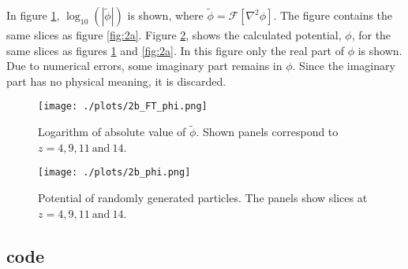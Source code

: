 In figure \ref{fig:2b_1}, $\log_{10} \left(| \widetilde{\phi} | \right)$ is shown, where $\widetilde{\phi} = \mathcal{F}\left[\nabla^2 \phi\right]$. The figure contains the same slices as figure \ref{fig:2a}. Figure \ref{fig:2b_2}, shows the calculated potential, $\phi$, for the same slices as figures \ref{fig:2b_1} and \ref{fig:2a}. In this figure only the real part of $\phi$ is shown. Due to numerical errors, some imaginary part remains in $\phi$. Since the imaginary part has no physical meaning, it is discarded.

\begin{figure}[h]
    \centering
    \texttt{[image: ./plots/2b\_FT\_phi.png]}
    \caption{Logarithm of absolute value of $\widetilde{\phi}$. Shown panels correspond to $z=4,9,11 \ \mathrm{and}\  14$.}
    \label{fig:2b_1}
\end{figure}

\begin{figure}[h]
    \centering
    \texttt{[image: ./plots/2b\_phi.png]}
    \caption{Potential of randomly generated particles. The panels show slices at $z=4,9,11 \ \mathrm{and}\  14$.}
    \label{fig:2b_2}
\end{figure}

\newpage

\subsection*{code}\label{sec:2code}
